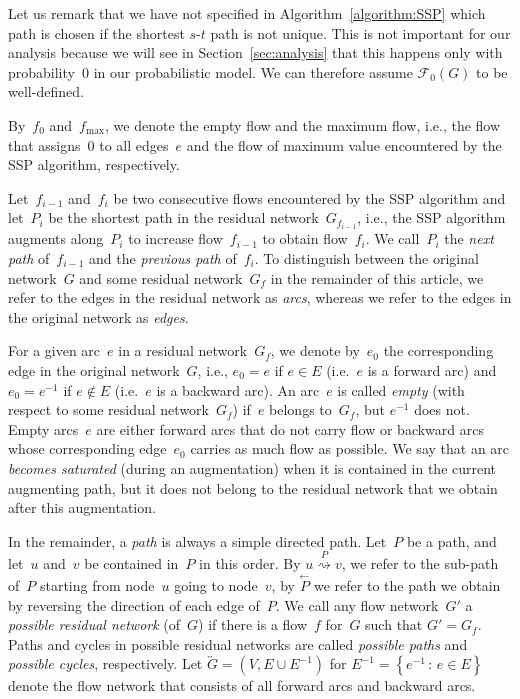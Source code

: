 \documentclass[11pt]{article}
\newcommand{\F}{\mathcal{F}}
\newcommand{\fmax}{f_{\max}}
\newcommand{\G}{\overleftrightarrow{G}}
\newcommand{\WHERE}{\,\colon\,}
\newcommand{\SET}[1]{\left\{#1\right\}}
\newcommand{\PATH}[1][]{\stackrel{#1}{\rightsquigarrow}}
\newcommand{\REVERSE}[1]{\stackrel{\leftarrow}{#1}}
\begin{document}
Let us remark that we have not specified in Algorithm~\ref{algorithm:SSP} which path is chosen if the shortest $s$-$t$ path is not unique. This is not important for our analysis because we will see in Section~\ref{sec:analysis} that this happens only with probability~$0$ in our probabilistic model. We can therefore assume $\F_0(G)$ to be well-defined.

By~$f_0$ and~$\fmax$, we denote the empty flow and the maximum flow, i.e., the flow that assigns~$0$ to all edges~$e$ and the flow of maximum value encountered by the SSP algorithm, respectively.

Let~$f_{i-1}$ and~$f_i$ be two consecutive flows encountered by the SSP algorithm and let~$P_i$ be the shortest path in the residual network~$G_{f_{i-1}}$, i.e., the SSP algorithm augments along~$P_i$ to increase flow~$f_{i-1}$ to obtain
flow~$f_i$. We call~$P_i$ the \emph{next path} of~$f_{i-1}$ and the \emph{previous path} of~$f_i$. To distinguish between the original network~$G$ and some residual network~$G_f$ in the remainder of this article, we refer to the edges in the residual network
as \emph{arcs}, whereas we refer to the edges in the original network
as \emph{edges}.

For a given arc~$e$ in a residual network~$G_f$, we denote by~$e_0$ the corresponding edge in the original network~$G$, i.e., $e_0 = e$ if $e \in E$ (i.e.~$e$ is a forward arc) and $e_0 = e^{-1}$ if $e \notin E$ (i.e.~$e$ is a backward arc). An arc~$e$ is called \emph{empty} (with respect to some residual network~$G_f$) if~$e$ belongs to~$G_f$, but $e^{-1}$ does not. Empty arcs~$e$ are either forward arcs that do not carry flow or backward arcs whose corresponding edge~$e_0$ carries as much flow as possible. We say that an arc \emph{becomes saturated} (during an augmentation) when it is contained in the current augmenting path, but it does not belong to the residual network that we obtain after this augmentation.

In the remainder, a \emph{path} is always a simple directed path.
Let~$P$ be a path, and let~$u$ and~$v$ be contained in~$P$ in this order. By $u \PATH[P] v$, we refer to the sub-path of~$P$ starting from node~$u$ going to node~$v$, by $\REVERSE{P}$ we refer to the path we obtain by reversing the direction of each edge of~$P$. We call any flow network~$G'$ a \emph{possible residual network} (of~$G$) if there is a flow~$f$ for~$G$ such that $G' = G_f$. Paths and cycles in possible residual networks are called \emph{possible paths} and \emph{possible cycles}, respectively. Let $\G = (V, E \cup E^{-1})$ for $E^{-1} = \SET{ e^{-1} \WHERE e \in E }$ denote the flow network that consists of all forward arcs and backward arcs. 
\end{document}
